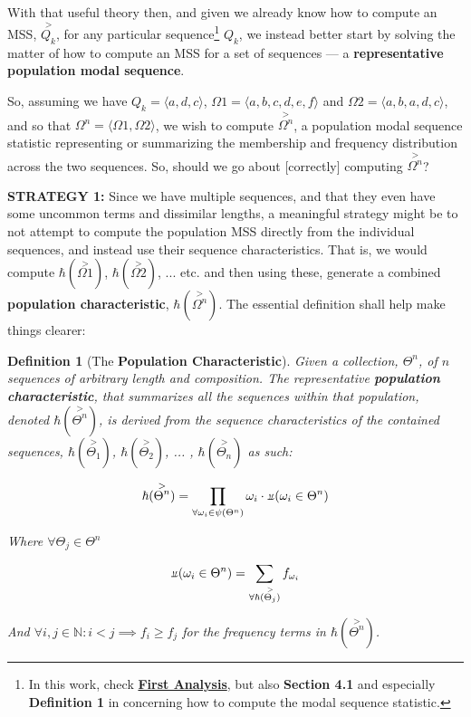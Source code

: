 \documentclass[a4paper, 18pt]{book} %
\newtheorem{defn}{Definition}
\newcommand{\invpi}{\rotatebox[origin=c]{180}{$\pi$}}
\begin{document}
With that useful theory then, and given we already know how to compute an MSS, $\overset{>}{Q_k}$, for any particular sequence\footnote{In this work, check \textbf{\hyperref[SECFANAL]{First Analysis}}, but also \textbf{Section 4.1} and especially \textbf{Definition 1} in \cite{transformatics} concerning how to compute the modal sequence statistic.} $Q_k$, we instead better start by solving the matter of how to compute an MSS for a set of sequences --- a \textbf{representative population modal sequence}.


So, assuming we have $Q_k = \langle a, d, c \rangle$, $\Omega1 = \langle a, b, c, d, e, f \rangle$ and $\Omega2 = \langle a, b, a, d, c \rangle$, and so that $\Omega^n = \langle \Omega1, \Omega2 \rangle$, we wish to compute $\overset{>}{\Omega^n}$, a population modal sequence statistic representing or summarizing the membership and frequency distribution across the two sequences. So, should we go about [correctly] computing $\overset{>}{\Omega^n}$?

\textbf{STRATEGY 1:} Since we have multiple sequences, and that they even have some uncommon terms and dissimilar lengths, a meaningful strategy might be to not attempt to compute the population MSS directly from the individual sequences, and instead use their sequence characteristics. That is, we would compute $\hbar(\overset{>}{\Omega1})$, $\hbar(\overset{>}{\Omega2})$, ... etc. and then using these, generate a combined \textbf{population characteristic}, $\hbar(\overset{>}{\Omega^n})$. The essential definition shall help make things clearer:\\


\begin{defn}[The \textbf{Population Characteristic}]
\label{DEFPOPCHAR}
Given a collection, $\Theta^n$, of $n$ sequences of arbitrary length and composition. The representative \textbf{population characteristic}, that summarizes all the sequences within that population, denoted $\hbar(\overset{>}{\Theta^n})$, is derived from the sequence characteristics of the contained sequences, $\hbar(\overset{>}{\Theta_1})$, $\hbar(\overset{>}{\Theta_2})$, ... , $\hbar(\overset{>}{\Theta_n})$ as such:

\begin{equation}
\label{EQPOPCHAR}
\hbar(\overset{>}{\Theta^n}) = \prod\limits_{\forall \omega_i \in \psi(\Theta^n)} \omega_i \cdot \invpi(\omega_i \in \Theta^n)
\end{equation}

Where $\forall \Theta_j \in \Theta^n$

\begin{equation}
\invpi(\omega_i \in \Theta^n) = \sum\limits_{\forall \hbar(\overset{>}{\Theta_j})} f_{\omega_i}
\end{equation}

And $\forall i, j \in \mathbb{N}: i < j \implies f_i \geq f_j$ for the frequency terms in $\hbar(\overset{>}{\Theta^n})$.
\end{defn}
\end{document}
